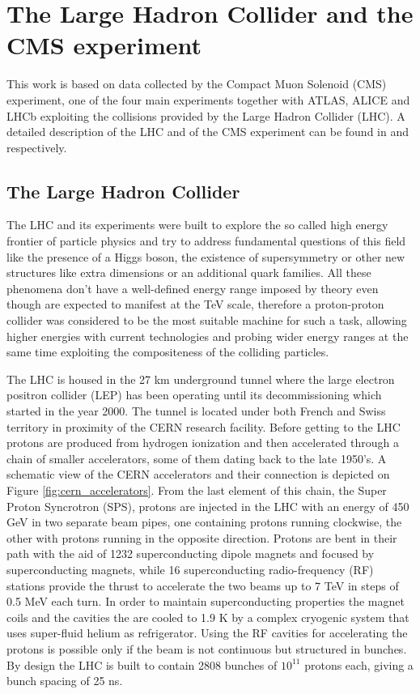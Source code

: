\chapter{The Large Hadron Collider and the CMS experiment}

This work is based on data collected by the Compact Muon Solenoid (CMS) experiment, 
one of the four main experiments together with ATLAS, ALICE and LHCb exploiting the collisions 
provided by the Large Hadron Collider (LHC). A detailed description of the LHC and of the CMS 
experiment can be found in \cite{Evans:2006tq} and \cite{Chatrchyan:2008aa} respectively.

\section{The Large Hadron Collider}

The LHC and its experiments were built to explore the so called high energy frontier of particle physics and try to address fundamental questions of this field like the presence of a Higgs boson, the existence of supersymmetry or other new structures like extra dimensions or an additional quark families. All these phenomena don't have a well-defined energy range imposed by theory even though are expected to manifest at the TeV scale, therefore a proton-proton collider was considered to be the most suitable machine for such a task, allowing higher energies with current technologies and probing wider energy ranges at the same time exploiting the compositeness of the colliding particles.

The LHC is housed in the 27 km underground tunnel where the large electron positron collider (LEP) has been operating until its decommissioning which started in the year 2000. The tunnel is located under both French and Swiss territory in proximity of the CERN research facility. Before getting to the LHC protons are produced from hydrogen ionization and then accelerated through a chain of smaller accelerators, some of them dating back to the late 1950's. A schematic view of the CERN accelerators and their connection is depicted on Figure \ref{fig:cern_accelerators}. From the last element of this chain, the Super Proton Syncrotron (SPS), protons are injected in the LHC with an energy of 450 GeV in two separate beam pipes, one containing protons running clockwise, the other with protons running in the opposite direction. Protons are bent in their path with the aid of 1232 superconducting dipole magnets and focused by  superconducting magnets, while 16 superconducting radio-frequency (RF) stations provide the thrust to accelerate the two beams up to 7 TeV in steps of 0.5 MeV each turn. In order to maintain superconducting properties the magnet coils and the cavities the are cooled to 1.9 K by a complex cryogenic system that uses super-fluid helium as refrigerator. Using the RF cavities for accelerating the protons is possible only if the beam is not continuous but structured in bunches. By design the LHC is built to contain 2808 bunches of $10^{11}$ protons each, giving a bunch spacing of 25 ns.


